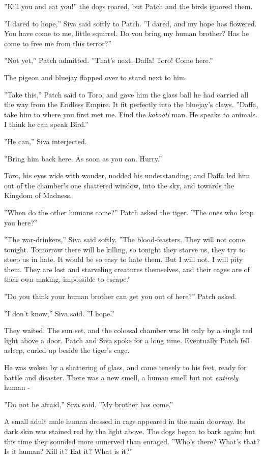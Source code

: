 \documentclass[12pt]{book}
\begin{document}
''Kill you and eat you!'' the dogs roared, but Patch and the birds ignored them.

''I dared to hope,'' Siva said softly to Patch. ''I dared, and my hope has flowered. You have come to me, little squirrel. Do you bring my human brother? Has he come to free me from this terror?''

''Not yet,'' Patch admitted. ''That's next. Daffa! Toro! Come here.''

The pigeon and bluejay flapped over to stand next to him.

''Take this,'' Patch said to Toro, and gave him the glass ball he had carried all the way from the Endless Empire. It fit perfectly into the bluejay's claws. ''Daffa, take him to where you first met me. Find the {\it kabooti} man. He speaks to animals. I think he can speak Bird.''

''He can,'' Siva interjected.

''Bring him back here. As soon as you can. Hurry.''

Toro, his eyes wide with wonder, nodded his understanding; and Daffa led him out of the chamber's one shattered window, into the sky, and towards the Kingdom of Madness.

''When do the other humans come?'' Patch asked the tiger. ''The ones who keep you here?''

''The war-drinkers,'' Siva said softly. ''The blood-feasters. They will not come tonight. Tomorrow there will be killing, so tonight they starve us, they try to steep us in hate. It would be so easy to hate them. But I will not. I will pity them. They are lost and starveling creatures themselves, and their cages are of their own making, impossible to escape.''

''Do you think your human brother can get you out of here?'' Patch asked.

''I don't know,'' Siva said. ''I hope.''

They waited. The sun set, and the colossal chamber was lit only by a single red light above a door. Patch and Siva spoke for a long time. Eventually Patch fell asleep, curled up beside the tiger's cage.

He was woken by a shattering of glass, and came tensely to his feet, ready for battle and disaster. There was a new smell, a human smell %
but not {\it entirely} human -

''Do not be afraid,'' Siva said. ''My brother has come.''

A small adult male human dressed in rags appeared in the main doorway. Its dark skin was stained red by the light above. The dogs began to bark again; but this time they sounded more unnerved than enraged. ''Who's there? What's that? Is it human? Kill it? Eat it? What is it?''
\end{document}
